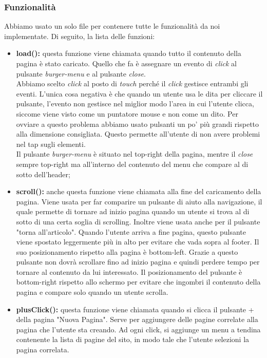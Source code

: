\subsubsection{Funzionalità}
Abbiamo usato un solo file per contenere tutte le funzionalità da noi implementate. Di seguito, la lista delle funzioni:
\begin{itemize}
	\item \textbf{load():} questa funzione viene chiamata quando tutto il contenuto della pagina è stato caricato. Quello che fa è assegnare un evento di \textit{click} al pulsante \textit{burger-menu} e al pulsante \textit{close}.\\
	Abbiamo scelto \textit{click} al posto di \textit{touch} perché il \textit{click} gestisce entrambi gli eventi. L'unica cosa negativa è che quando un utente usa le dita per cliccare il pulsante, l'evento non gestisce nel miglior modo l'area in cui l'utente clicca, siccome viene visto come un puntatore mouse e non come un dito. Per ovviare a questo problema abbiamo usato pulsanti un po' più grandi rispetto alla dimensione consigliata. Questo permette all'utente di non avere problemi nel tap sugli elementi.\\
	Il pulsante \textit{burger-menu} è situato nel top-right della pagina, mentre il \textit{close} sempre top-right ma all'interno del contenuto del menu che compare al di sotto dell'header;
	\item \textbf{scroll():} anche questa funzione viene chiamata alla fine del caricamento della pagina. Viene usata per far comparire un pulsante di aiuto alla navigazione, il quale permette di tornare ad inizio pagina quando un utente si trova al di sotto di una certa soglia di scrolling. Inoltre viene usata anche per il pulsante "torna all'articolo". Quando l'utente arriva a fine pagina, questo pulsante viene spostato leggermente più in alto per evitare che vada sopra al footer. Il suo posizionamento rispetto alla pagina è bottom-left. Grazie a questo pulsante non dovrà scrollare fino ad inizio pagina e quindi perdere tempo per tornare al contenuto da lui interessato. Il posizionamento del pulsante è bottom-right rispetto allo schermo per evitare che ingombri il contenuto della pagina e compare solo quando un utente scrolla.
	\item \textbf{plusClick():} questa funzione viene chiamata quando si clicca il pulsante + della pagina "Nuova Pagina". Serve per aggiungere delle pagine correlate alla pagina che l'utente sta creando. Ad ogni click, si aggiunge un menu a tendina contenente la lista di pagine del sito, in modo tale che l'utente selezioni la pagina correlata.

\end{itemize}
